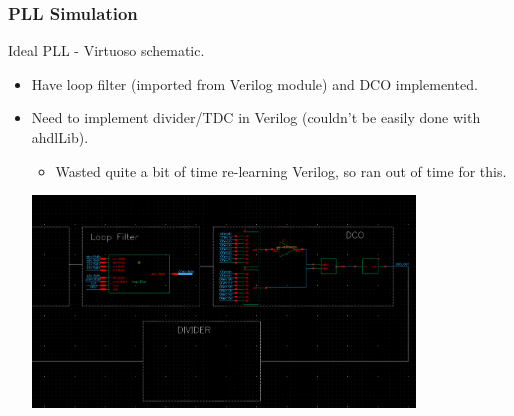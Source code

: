 \documentclass[t, screen, aspectratio=43]{beamer}
\begin{document}
\begin{frame}
	\frametitle{PLL Simulation}
	\begin{block}{Ideal PLL - Virtuoso schematic.}
		\begin{itemize}
			\scriptsize
			\item Have loop filter (imported from Verilog module) and DCO implemented.
			\item Need to implement divider/TDC in Verilog (couldn't be easily done with ahdlLib).
			\begin{itemize}
				\scriptsize
				\item Wasted quite a bit of time re-learning Verilog, so ran out of time for this.
			\end{itemize}
			\vspace{-0.5em}
			\center\includegraphics[width=0.8\textwidth, angle=0]{pll_virtuoso.png}
			\vspace{-0.5em}
		\end{itemize} 	
	\end{block}
\end{frame}
\end{document}
